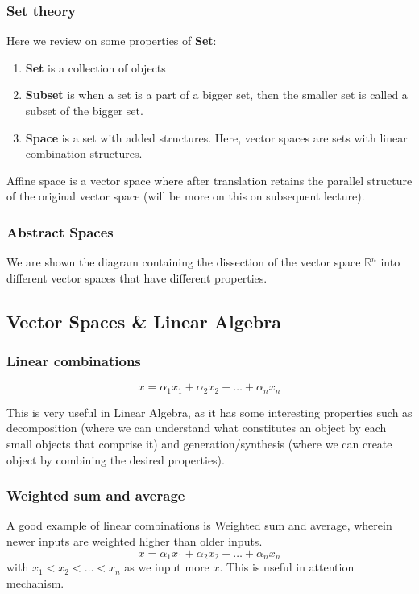 \documentclass[12pt]{article}
\begin{document}
\subsubsection*{Set theory}
Here we review on some properties of \textbf{Set}:
\begin{enumerate}
\item \textbf{Set} is a collection of objects
\item \textbf{Subset} is when a set is a part of a bigger set, then the smaller set is called a subset of the bigger set.
\item \textbf{Space} is a set with added structures. Here, vector spaces are sets with linear combination structures.
\end{enumerate}
Affine space is a vector space where after translation retains the parallel structure of the original vector space (will be more on this on subsequent lecture).


\subsubsection*{Abstract Spaces}
We are shown the diagram containing the dissection of the vector space $\mathbb{R}^n$ into different vector spaces that have different properties.


\subsection*{Vector Spaces \& Linear Algebra}

\subsubsection*{Linear combinations}
$$x=\alpha_1x_1+\alpha_2x_2+\ldots+\alpha_nx_n$$

This is very useful in Linear Algebra, as it has some interesting properties such as decomposition (where we can understand what constitutes an object by each small objects that comprise it) and generation/synthesis (where we can create object by combining the desired properties).

\subsubsection*{Weighted sum and average}
A good example of linear combinations is Weighted sum and average, wherein newer inputs are weighted higher than older inputs. 
$$x=\alpha_1x_1+\alpha_2x_2+\ldots+\alpha_nx_n$$
with $x_1<x_2<\ldots<x_n$ as we input more $x$. This is useful in attention mechanism.
\end{document}

